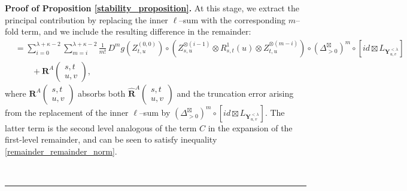 \documentclass{article}%
\newenvironment{proof}[1][Proof]{\noindent\textbf{#1.} }{\ \rule{0.5em}{0.5em}}
\begin{document}
\begin{proof}[Proof of Proposition \ref{stability_proposition}]
At this stage, we extract the principal contribution by replacing the inner
$\ell$--sum with the corresponding $m$--fold term, and we include the resulting
difference in the remainder:
\begin{align*}
&=
\sum_{i=0}^{\lambda+\kappa-2}
\sum_{m=i}^{\lambda+\kappa-2}
\frac{1}{m!}\,
D^m g\left(Z^{(0,0)}_{t,u}\right)
\circ
\left(
Z^{\otimes(i-1)}_{s,u}\otimes R^1_{s,t}(u)\otimes Z^{\otimes(m-i)}_{t,u}
\right)
\circ
(\Delta^{\boxtimes}_{>0})^{m}
\circ
\left[id \boxtimes L_{\mathbf{Y}^{<\lambda}_{u,v}}\right]
\\
&\qquad + \mathbf{R}^{A}\begin{pmatrix} s,t \\ u, v \end{pmatrix},
\end{align*}
where $\mathbf{R}^{A}\begin{pmatrix} s,t \\ u, v \end{pmatrix}$ absorbs both
$\hat{\mathbf{R}}^{A}\begin{pmatrix} s,t \\ u, v \end{pmatrix}$ and the truncation error arising from the
replacement of the inner $\ell$--sum by
$(\Delta^{\boxtimes}_{>0})^{m}\circ[id \boxtimes L_{\mathbf{Y}^{<\lambda}_{u,v}}]$. The latter term is the second level analogous of the term $C$ in the expansion of the first-level remainder, and can be seen to satisfy inequality \eqref{remainder_remainder_norm}.


\end{proof}
\end{document}
